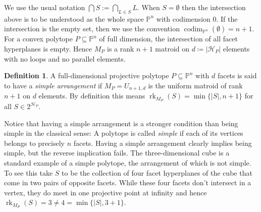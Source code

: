 \documentclass[a4paper,10pt]{amsart}
\theoremstyle{definition}
\newtheorem{defin}{Definition}[section]
\theoremstyle{plain}
\newcommand{\codim}{\operatorname{codim}}
\newcommand{\rk}{\operatorname{rk}}
\newcommand{\cH}{{\mathcal H}}
\newcommand{\pp}{\mathbb{P}}
\begin{document}
We use the usual notation $\bigcap S:=\bigcap_{L\in S}L$. When $S=\emptyset$ then the intersection above is to be understood as the whole space $\pp^n$ with codimension 0. If the intersection is the empty set, then we use the convention $\codim_{\pp^n}(\emptyset)=n+1$. For a convex polytope $P\subseteq \pp^n$ of full dimension, the intersection of all facet hyperplanes is empty. Hence $M_P$ is a rank $n+1$ matroid on $d\coloneqq |\cH_P|$ elements with no loops and no parallel elements. 

\begin{defin}
 A full-dimensional projective polytope $P\subseteq \pp^n$ with $d$ facets is said to have a \emph{simple arrangement} if $M_P=U_{n+1,d}$ is the uniform matroid of rank $n+1$ on $d$ elements. By definition this means $\rk_{M_P}(S)=\min\{|S|,n+1\}$ for all $S \in 2^{\cH_P}$.
\end{defin}

Notice that having a simple arrangement is a stronger condition than being simple in the classical sense: A polytope is called \emph{simple} if each of its vertices belongs to precisely $n$ facets. Having a simple arrangement clearly implies being simple, but the reverse implication fails. The three-dimensional cube is a standard example of a simple polytope, the arrangement of which is not simple. To see this take $S$ to be the collection of four facet hyperplanes of the cube that come in two pairs of opposite facets. While these four facets don't intersect in a vertex, they do meet in one projective point at infinity and hence $\rk_{M_P}(S)=3\neq 4=\min\{|S|,3+1\}$.
\end{document}
